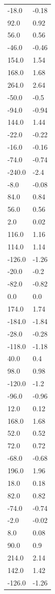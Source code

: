 \begin{longtable}{ll}
-18.0 & -0.18 \\
92.0 & 0.92 \\
56.0 & 0.56 \\
-46.0 & -0.46 \\
154.0 & 1.54 \\
168.0 & 1.68 \\
264.0 & 2.64 \\
-50.0 & -0.5 \\
-94.0 & -0.94 \\
144.0 & 1.44 \\
-22.0 & -0.22 \\
-16.0 & -0.16 \\
-74.0 & -0.74 \\
-240.0 & -2.4 \\
-8.0 & -0.08 \\
84.0 & 0.84 \\
56.0 & 0.56 \\
2.0 & 0.02 \\
116.0 & 1.16 \\
114.0 & 1.14 \\
-126.0 & -1.26 \\
-20.0 & -0.2 \\
-82.0 & -0.82 \\
0.0 & 0.0 \\
174.0 & 1.74 \\
-184.0 & -1.84 \\
-28.0 & -0.28 \\
-118.0 & -1.18 \\
40.0 & 0.4 \\
98.0 & 0.98 \\
-120.0 & -1.2 \\
-96.0 & -0.96 \\
12.0 & 0.12 \\
168.0 & 1.68 \\
52.0 & 0.52 \\
72.0 & 0.72 \\
-68.0 & -0.68 \\
196.0 & 1.96 \\
18.0 & 0.18 \\
82.0 & 0.82 \\
-74.0 & -0.74 \\
-2.0 & -0.02 \\
8.0 & 0.08 \\
90.0 & 0.9 \\
214.0 & 2.14 \\
142.0 & 1.42 \\
-126.0 & -1.26 \\

\end{longtable}
